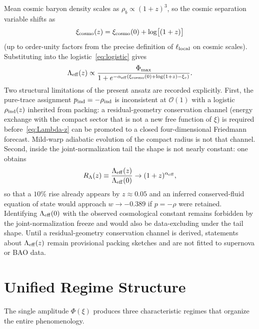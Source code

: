 \documentclass[11pt,a4paper]{article}
\begin{document}
Mean cosmic baryon density scales as \(\rho_b\propto(1+z)^3\), so the cosmic separation variable shifts as
\begin{equation}
\xi_{\rm cosmo}(z)=\xi_{\rm cosmo}(0)+\log\bigl[(1+z)\bigr]
\label{eq:xi-z}
\end{equation}
(up to order-unity factors from the precise definition of \(\ell_{\rm local}\) on cosmic scales). Substituting into the logistic~\eqref{eq:logistic} gives
\begin{equation}
\Lambda_{\rm eff}(z)\propto
\frac{\Phi_{\rm max}}{1+e^{-\alpha_{\rm eff}(\xi_{\rm cosmo}(0)+\log(1+z)-\xi_c)}}.
\label{eq:Lambda-z}
\end{equation}
Two structural limitations of the present ansatz are recorded explicitly. First, the pure-trace assignment \(p_{\rm ind}=-\rho_{\rm ind}\) is inconsistent at \(\mathcal{O}(1)\) with a logistic \(\rho_{\rm ind}(z)\) inherited from packing: a residual-geometry conservation channel (energy exchange with the compact sector that is not a new free function of \(\xi\)) is required before~\eqref{eq:Lambda-z} can be promoted to a closed four-dimensional Friedmann forecast. Mild-warp adiabatic evolution of the compact radius is not that channel. Second, inside the joint-normalization tail the shape is not nearly constant: one obtains
\[
R_\Lambda(z)\equiv\frac{\Lambda_{\rm eff}(z)}{\Lambda_{\rm eff}(0)}\to(1+z)^{\alpha_{\rm eff}},
\]
so that a \(10\%\) rise already appears by \(z\approx0.05\) and an inferred conserved-fluid equation of state would approach \(w\to-0.389\) if \(p=-\rho\) were retained. Identifying \(\Lambda_{\rm eff}(0)\) with the observed cosmological constant remains forbidden by the joint-normalization freeze and would also be data-excluding under the tail shape. Until a residual-geometry conservation channel is derived, statements about \(\Lambda_{\rm eff}(z)\) remain provisional packing sketches and are not fitted to supernova or BAO data.

\section{Unified Regime Structure}

The single amplitude \(\Phi(\xi)\) produces three characteristic regimes that organize the entire phenomenology.
\end{document}
